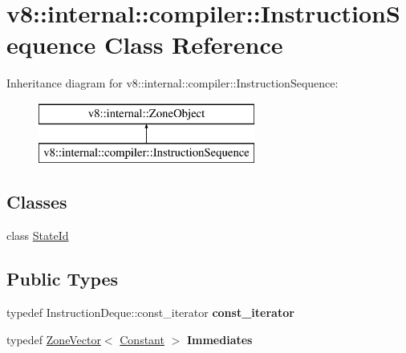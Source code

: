 \hypertarget{classv8_1_1internal_1_1compiler_1_1_instruction_sequence}{}\section{v8\+:\+:internal\+:\+:compiler\+:\+:Instruction\+Sequence Class Reference}
\label{classv8_1_1internal_1_1compiler_1_1_instruction_sequence}
Inheritance diagram for v8\+:\+:internal\+:\+:compiler\+:\+:Instruction\+Sequence\+:\begin{figure}[H]
\begin{center}
\leavevmode
\includegraphics[height=2.000000cm]{classv8_1_1internal_1_1compiler_1_1_instruction_sequence}
\end{center}
\end{figure}
\subsection*{Classes}
\begin{DoxyCompactItemize}
\item 
class \hyperlink{classv8_1_1internal_1_1compiler_1_1_instruction_sequence_1_1_state_id}{State\+Id}
\end{DoxyCompactItemize}
\subsection*{Public Types}
\begin{DoxyCompactItemize}
\item 
typedef Instruction\+Deque\+::const\+\_\+iterator {\bfseries const\+\_\+iterator}\hypertarget{classv8_1_1internal_1_1compiler_1_1_instruction_sequence_ab15b72b20e24e09dd5d2eca12113a265}{}\label{classv8_1_1internal_1_1compiler_1_1_instruction_sequence_ab15b72b20e24e09dd5d2eca12113a265}

\item 
typedef \hyperlink{classv8_1_1internal_1_1_zone_vector}{Zone\+Vector}$<$ \hyperlink{classv8_1_1internal_1_1compiler_1_1_constant}{Constant} $>$ {\bfseries Immediates}\hypertarget{classv8_1_1internal_1_1compiler_1_1_instruction_sequence_a454e726f151fd3538e4f3aa468844460}{}\label{classv8_1_1internal_1_1compiler_1_1_instruction_sequence_a454e726f151fd3538e4f3aa468844460}

\end{DoxyCompactItemize}
